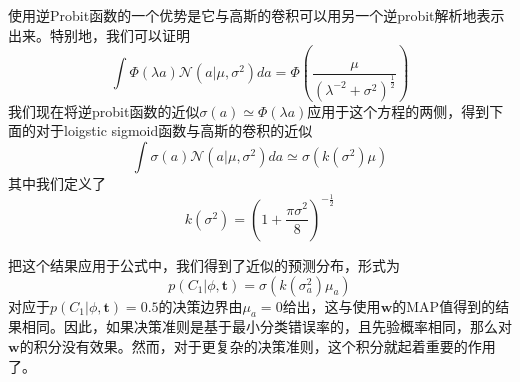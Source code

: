 使用逆Probit函数的一个优势是它与高斯的卷积可以用另一个逆probit解析地表示出来。特别地，我们可以证明 
\begin{equation}
	\int \Phi(\lambda a)\mathcal{N}(a|\mu,\sigma^2)da=\Phi\left(\frac{\mu}{(\lambda^{-2}+\sigma^2)^{\frac{1}{2}}} \right)
\end{equation}
我们现在将逆probit函数的近似$\sigma(a)\simeq \Phi(\lambda a)$应用于这个方程的两侧，得到下面的对于loigstic sigmoid函数与高斯的卷积的近似
\begin{equation}
\label{4153}
	\int \sigma(a)\mathcal{N}(a|\mu,\sigma^2)da\simeq \sigma(k(\sigma^2)\mu)
\end{equation}
其中我们定义了
\begin{equation}
\label{4154}
	k(\sigma^2)=(1+\frac{\pi\sigma^2}{8})^{-\frac{1}{2}}
\end{equation}

把这个结果应用于公式中，我们得到了近似的预测分布，形式为
\begin{equation}
\label{jiasup}
	p(C_1|\phi,\boldsymbol{t})=\sigma(k(\sigma_a^2)\mu_a)
\end{equation}
对应于$p(C_1|\phi,\boldsymbol{t})=0.5$的决策边界由$\mu_a=0$给出，这与使用$\boldsymbol{w}$的MAP值得到的结果相同。因此，如果决策准则是基于最小分类错误率的，且先验概率相同，那么对$\boldsymbol{w}$的积分没有效果。然而，对于更复杂的决策准则，这个积分就起着重要的作用了。